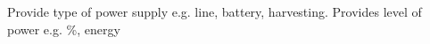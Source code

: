 \documentclass[a4paper]{arrowhead}
\newcommand{\pref}[1]{{\textcolor{ArrowheadGrey}{\hyperref[sec:model:primitives:#1]{#1}}}}
\begin{document}



Provide type of power supply e.g. line, battery, harvesting.
Provides level of power e.g. \%, energy



\end{document}
